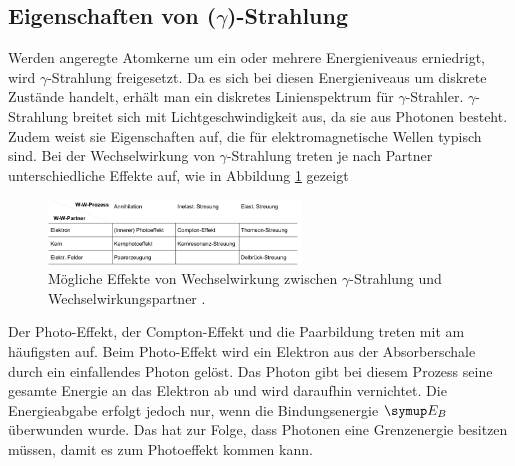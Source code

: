\subsection{\texorpdfstring{Eigenschaften von ($\gamma$)}{(Eigenschaften von gamma)}-Strahlung}
Werden angeregte Atomkerne um ein oder mehrere Energieniveaus erniedrigt, wird
$\gamma$-Strahlung freigesetzt. Da es sich bei diesen Energieniveaus um diskrete
Zustände handelt, erhält man ein diskretes Linienspektrum für $\gamma$-Strahler.
$\gamma$-Strahlung breitet sich mit Lichtgeschwindigkeit aus, da sie aus Photonen
besteht. Zudem weist sie Eigenschaften auf, die für elektromagnetische Wellen
typisch sind.
Bei der Wechselwirkung von $\gamma$-Strahlung treten je nach Partner
unterschiedliche Effekte auf, wie in Abbildung \ref{fig:ww} gezeigt
\begin{figure}[H]
  \centering
  \includegraphics[width=0.6\textwidth]{bilder/wechselgamma.jpg}
  \caption{Mögliche Effekte von Wechselwirkung zwischen $\gamma$-Strahlung
  und Wechselwirkungspartner \cite{704}.}
  \label{fig:ww}
\end{figure}
Der Photo-Effekt, der Compton-Effekt und die Paarbildung treten mit am häufigsten
auf.
Beim Photo-Effekt wird ein Elektron aus der Absorberschale durch ein einfallendes
Photon gelöst. Das Photon gibt bei diesem Prozess seine gesamte Energie an das
Elektron ab und wird daraufhin vernichtet. Die Energieabgabe erfolgt jedoch nur,
wenn die Bindungsenergie $\su{E_B}$ überwunden wurde. Das hat zur Folge, dass
Photonen eine Grenzenergie besitzen müssen, damit es zum Photoeffekt kommen kann.

